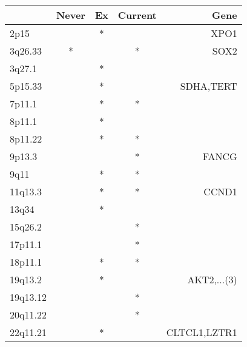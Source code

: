 \begin{tabular}{lcccr}
\toprule
{} & Never & Ex & Current &          Gene \\
\midrule
2p15     &       &  * &         &          XPO1 \\
3q26.33  &     * &    &       * &          SOX2 \\
3q27.1   &       &  * &         &               \\
5p15.33  &       &  * &         &     SDHA,TERT \\
7p11.1   &       &  * &       * &               \\
8p11.1   &       &  * &         &               \\
8p11.22  &       &  * &       * &               \\
9p13.3   &       &    &       * &         FANCG \\
9q11     &       &  * &       * &               \\
11q13.3  &       &  * &       * &         CCND1 \\
13q34    &       &  * &         &               \\
15q26.2  &       &    &       * &               \\
17p11.1  &       &    &       * &               \\
18p11.1  &       &  * &       * &               \\
19q13.2  &       &  * &         &   AKT2,...(3) \\
19q13.12 &       &    &       * &               \\
20q11.22 &       &    &       * &               \\
22q11.21 &       &  * &         &  CLTCL1,LZTR1 \\
\bottomrule
\end{tabular}
